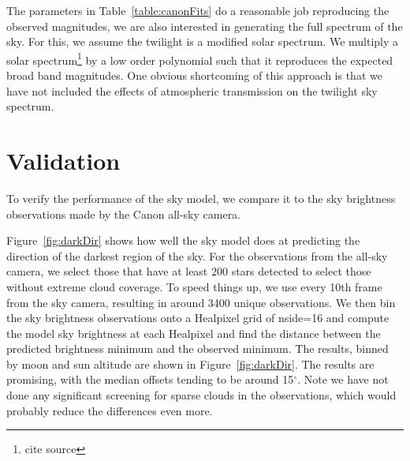 \documentclass{emulateapj}  %
\newcommand\degree{{^\circ}}
\begin{document}
The parameters in Table~\ref{table:canonFits} do a reasonable job reproducing the observed magnitudes, we are also interested in generating the full spectrum of the sky.  For this, we assume the twilight is a modified solar spectrum.  We multiply a solar spectrum\footnote{cite source} by a low order polynomial such that it reproduces the expected broad band magnitudes.  One obvious shortcoming of this approach is that we have not included the effects of atmospheric transmission on the twilight sky spectrum.  


\section{Validation}

To verify the performance of the sky model, we compare it to the sky brightness observations made by the Canon all-sky camera.

\begin{figure*}
  \caption{Some examples of Canon all-sky observations and model values for airmasses less than 2.1. The sky observations have been binned into Healpixels. These are all for the Canon R-filter. The top row shows a clear dark-time frame, the second row is a dark time frame where there were clouds. The third row shows a high moon, and the final row is during twilight with some light clouds. \label{fig:skyExamples}}
\end{figure*}



Figure~\ref{fig:darkDir} shows how well the sky model does at predicting the direction of the darkest region of the sky.  For the observations from the all-sky camera, we select those that have at least 200 stars detected to select those without extreme cloud coverage. To speed things up, we use every 10th frame from the sky camera, resulting in around 3400 unique observations.  We then bin the sky brightness observations onto a Healpixel grid of nside=16 and compute the model sky brightness at each Healpixel and find the distance between the predicted brightness minimum and the observed minimum.  The results, binned by moon and sun altitude are shown in Figure~\ref{fig:darkDir}.  The results are promising, with the median offsets tending to be around 15$\degree$.  Note we have not done any significant screening for sparse clouds in the observations, which would probably reduce the differences even more. 
\end{document}
